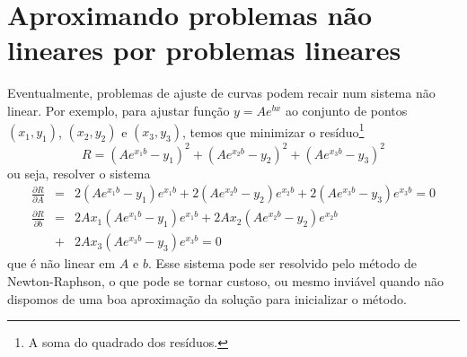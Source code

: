 





\section{Aproximando problemas não lineares por problemas lineares}

Eventualmente, problemas de ajuste de curvas podem recair num sistema não linear. Por exemplo, para ajustar função $y=Ae^{bx}$ ao conjunto de pontos $(x_1,y_1)$, $(x_2,y_2)$ e $(x_3,y_3)$, temos que minimizar o resíduo\footnote{A soma do quadrado dos resíduos.} 
$$
R=(Ae^{x_1b}-y_1)^2+(Ae^{x_2b}-y_2)^2+(Ae^{x_3b}-y_3)^2
$$
ou seja, resolver o sistema
\begin{eqnarray*}
\frac{\partial R}{\partial A} &=& 2(Ae^{x_1b}-y_1)e^{x_1b}+2(Ae^{x_2b}-y_2)e^{x_2b}+2(Ae^{x_3b}-y_3)e^{x_3b}=0\\
\frac{\partial R}{\partial b} &=& 2Ax_1(Ae^{x_1b}-y_1)e^{x_1b} + 2Ax_2(Ae^{x_2b}-y_2)e^{x_2b} \\
&+& 2Ax_3(Ae^{x_3b}-y_3)e^{x_3b}=0
\end{eqnarray*}
que é não linear em $A$ e $b$. Esse sistema pode ser resolvido pelo método de Newton-Raphson, o que pode se tornar custoso, ou mesmo inviável quando não dispomos de uma boa aproximação da solução para inicializar o método.

